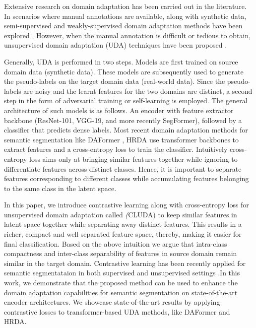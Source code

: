 \documentclass{article}
\begin{document}
Extensive research on domain adaptation has been carried out in the literature. In scenarios where manual annotations are available, along with synthetic data, semi-supervised and weakly-supervised domain adaptation methods have been explored \cite{french2019semi, hoyer2021three, lai2021semi, souly2017semi, dai2015boxsup, song2019box, zou2020pseudoseg}. However, when the manual annotation is difficult or tedious to obtain, unsupervised domain adaptation (UDA) techniques have been proposed \cite{hoffman2016fcns, tsai2018learning, zou2018unsupervised}. 

Generally, UDA is performed in two steps. Models are first trained on source domain data (synthetic data). These models are subsequently used to generate the pseudo-labels on the target domain data (real-world data). Since the pseudo-labels are noisy and the learnt features for the two domains are distinct, a second step in the form of adversarial training  \cite{hoffman2016fcns, tsai2018learning} or self-learning \cite{zhang2021prototypical, zou2018unsupervised} is employed. The general architecture of such models is as follows. An encoder with feature extractor backbone (ResNet-101\cite{he2016deep}, VGG-19\cite{simonyan2014very}, and more recently SegFormer\cite{hoyer2021daformer}), followed by a classifier that predicts dense labels. Most recent domain adaptation methods for semantic segmentation like DAFormer \cite{hoyer2021daformer}, HRDA \cite{hoyer2022hrda} use transformer backbones to extract features and a cross-entropy loss to train the classifier. Intuitively cross-entropy loss aims only at bringing similar features together while ignoring to differentiate features across distinct classes. Hence, it is important to separate features corresponding to different classes while accumulating features belonging to the same class in the latent space.

In this paper, we introduce contrastive learning along with cross-entropy loss for unsupervised domain adaptation called \textit(CLUDA) to keep similar features in latent space together while separating away distinct features. This results in a richer, compact and well separated feature space, thereby, making it easier for final classification. Based on the above intuition we argue that intra-class compactness and inter-class separability of features in source domain remain similar in the target domain. 
Contrastive learning has been recently applied for semantic segmentataion in both supervised \cite{hu2021region, zhong2021pixel, zhang2021looking, xie2021propagate, wang2021dense, lai2021semi, wang2021cross} and unsupervised settings \cite{he2020momentum,chen2020simple,cai2020joint,hadsell2006dimensionality,oord2018representation}.In this work, we demonstrate that the proposed method can be used to enhance the domain adaptation capabilities for semantic segmentation on state-of-the-art encoder architectures. We showcase state-of-the-art results by applying contrastive losses to transformer-based UDA methods, like DAFormer and HRDA.
\end{document}

